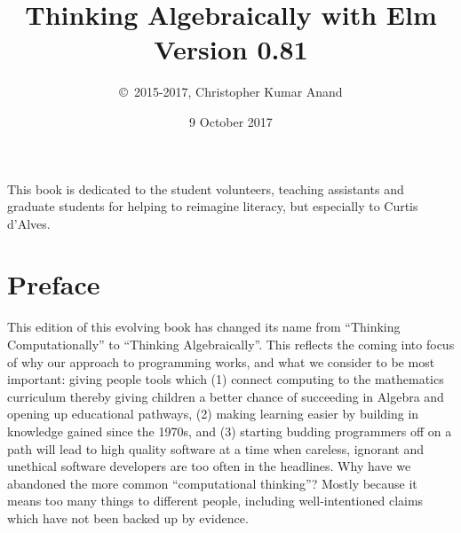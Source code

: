 \documentclass[12pt]{amsbook}
\title{Thinking Algebraically with Elm \\ Version 0.81}
\author{\copyright\ 2015-2017, Christopher Kumar Anand}
\date{9 October 2017}
\begin{document}
\maketitle

\vfill
\begin{center}
  This book is dedicated to the student volunteers, teaching assistants and 
  graduate students for helping to reimagine literacy,
  but especially to Curtis d'Alves. 
\end{center}
\vfill
\newpage

\tableofcontents


%
%
%
%
%
%  
%
%   
%






\chapter*{Preface}
%
This edition of this evolving book has changed its name from ``Thinking Computationally'' to ``Thinking Algebraically''.  
This reflects the coming into focus of why our approach to programming works,
and what we consider to be most important:  giving people tools which (1) connect computing to the mathematics curriculum thereby giving children a better chance of succeeding in Algebra and opening up educational pathways, (2) making learning easier by building in knowledge gained since the 1970s, and (3) starting budding programmers off on a path will lead to high quality software at a time when careless, ignorant and unethical software developers are too often in the headlines. 
Why have we abandoned the more common ``computational thinking''?  
Mostly because it means too many things to different people, including well-intentioned claims which have not been backed up by evidence.
\end{document}
